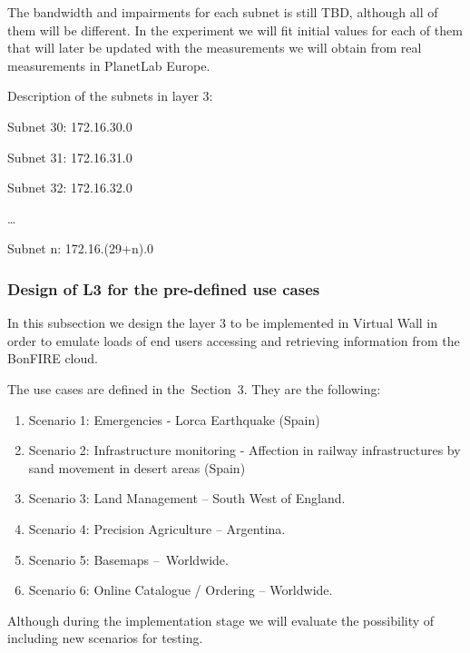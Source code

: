 \documentclass[a4paper]{article}
\newcounter{saveenum}
\newcommand\liststyleLFOxxxix{%
\renewcommand\theenumi{\arabic{enumi}}
\renewcommand\theenumii{\alph{enumii}}
\renewcommand\theenumiii{\roman{enumiii}}
\renewcommand\theenumiv{\arabic{enumiv}}
\renewcommand\labelenumi{\theenumi.}
\renewcommand\labelenumii{\theenumii.}
\renewcommand\labelenumiii{\theenumiii.}
\renewcommand\labelenumiv{\theenumiv.}
}
\begin{document}
\bigskip

The bandwidth and impairments for each subnet is still TBD, although all
of them will be different. In the experiment we will fit initial values
for each of them that will later be updated with the measurements we
will obtain from real measurements in PlanetLab Europe.


\bigskip

Description of the subnets in layer 3:


\bigskip

Subnet 30: 172.16.30.0

Subnet 31: 172.16.31.0

Subnet 32: 172.16.32.0

{\dots}

Subnet n: 172.16.(29+n).0

\subsubsection[Design of L3 for the pre{}-defined use cases]{Design of
L3 for the pre-defined use cases}
\hypertarget{Toc381777234}{}
\bigskip

In this subsection we design the layer 3 to be implemented in Virtual
Wall in order to emulate loads of end users accessing and retrieving
information from the BonFIRE cloud.


\bigskip

The use cases are defined in the\ Section\ 3. They are the following:

\liststyleLFOxxxix
\setcounter{saveenum}{\value{enumi}}
\begin{enumerate}
\setcounter{enumi}{\value{saveenum}}
\item Scenario 1: Emergencies - Lorca Earthquake (Spain)
\item Scenario 2: Infrastructure monitoring - Affection in railway
infrastructures by sand movement in desert areas (Spain)
\item Scenario 3: Land Management -- South West of England.
\item Scenario 4: Precision Agriculture -- Argentina.
\item Scenario 5: Basemaps --\ Worldwide.
\item Scenario 6: Online Catalogue / Ordering -- Worldwide.
\end{enumerate}
Although during the implementation stage we will evaluate the
possibility of including new scenarios for testing.


\bigskip
\end{document}
